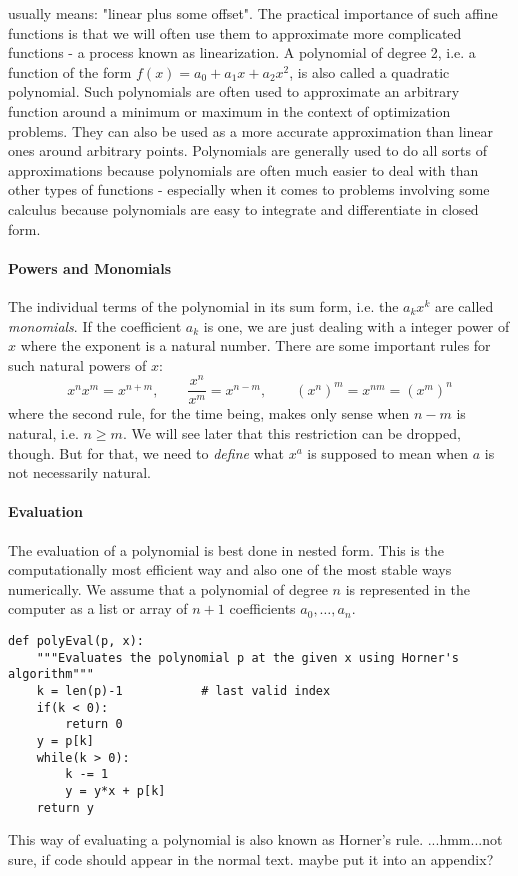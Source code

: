 usually means: "linear plus some offset". The practical importance of such affine functions is that we will often use them to approximate more complicated functions - a process known as linearization. A polynomial of degree 2, i.e. a function of the form $f(x) = a_0 + a_1 x + a_2 x^2$, is also called a quadratic polynomial. Such polynomials are often used to approximate an arbitrary function around a minimum or maximum in the context of optimization problems. They can also be used as a more accurate approximation than linear ones around arbitrary points. Polynomials are generally used to do all sorts of approximations because polynomials are often much easier to deal with than other types of functions - especially when it comes to problems involving some calculus because polynomials are easy to integrate and differentiate in closed form.


\paragraph{Powers and Monomials}
The individual terms of the polynomial in its sum form, i.e. the $a_k x^k$ are called \emph{monomials}. If the coefficient $a_k$ is one, we are just dealing with a integer power of $x$ where the exponent is a natural number. There are some important rules for such natural powers of $x$:
\begin{equation}
\label{Eq:PowerRulesNatural}
x^n x^m = x^{n+m}, \qquad
\frac{x^n}{x^m} = x^{n-m}, \qquad
(x^n)^m =  x^{n m} =  (x^m)^n
\end{equation}
where the second rule, for the time being, makes only sense when $n-m$ is natural, i.e. $n \geq m$. We will see later that this restriction can be dropped, though. But for that, we need to \emph{define} what $x^a$ is supposed to mean when $a$ is not necessarily natural.

\paragraph{Evaluation}
The evaluation of a polynomial is best done in nested form. This is the computationally most efficient way and also one of the most stable ways numerically. We assume that a polynomial of degree $n$ is represented in the computer as a list or array of $n+1$ coefficients $a_0, \ldots, a_n$.
\begin{lstlisting}
def polyEval(p, x):
	"""Evaluates the polynomial p at the given x using Horner's algorithm"""
	k = len(p)-1           # last valid index
	if(k < 0):
		return 0
	y = p[k]
	while(k > 0):
		k -= 1
		y = y*x + p[k]
	return y
\end{lstlisting}
This way of evaluating a polynomial is also known as Horner's rule.
...hmm...not sure, if code should appear in the normal text. maybe put it into an appendix? 


